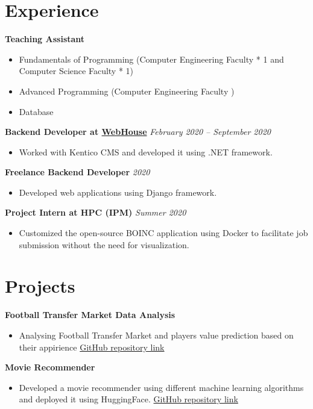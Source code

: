 \documentclass[a4paper,10pt]{article}
\begin{document}
\section*{Experience}
\textbf{Teaching Assistant}
\begin{itemize}
  \item Fundamentals of Programming (Computer Engineering Faculty 
 * 1 and Computer Science Faculty * 1)
  \item Advanced Programming (Computer Engineering Faculty )
  \item Database
\end{itemize}

\textbf{Backend Developer at \href{https://www.linkedin.com/company/webhouse-ir/}{WebHouse}} \hfill \textit{February 2020 -- September 2020}
\begin{itemize}
  \item Worked with Kentico CMS and developed it using .NET framework.
\end{itemize}

\textbf{Freelance Backend Developer} \hfill \textit{2020}
\begin{itemize}
  \item Developed web applications using Django framework.
\end{itemize}

\textbf{Project Intern at HPC (IPM)} \hfill \textit{Summer 2020}
\begin{itemize}
  \item Customized the open-source BOINC application using Docker to facilitate job submission without the need for visualization.
\end{itemize}


\section*{Projects}

\textbf{Football Transfer Market Data Analysis}
\begin{itemize}
  \item Analysing Football Transfer Market and players value prediction based on their appirience  \href{https://github.com/sepehr-mousaviyan/Football-Transfer-Market-Data-Analysis}{GitHub repository link}
\end{itemize}

\textbf{Movie Recommender}
\begin{itemize}
  \item Developed a movie recommender using different machine learning algorithms and deployed it using HuggingFace. \href{https://github.com/sepehr-mousaviyan/Movie_Recommender}{GitHub repository link}
\end{itemize}
\end{document}
